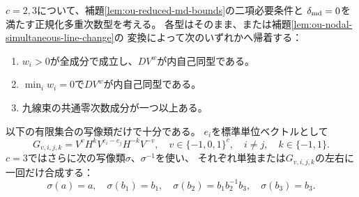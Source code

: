 \begin{proposition}[全節点型候補の有限等式証明書]
\label{prop:ou-nodal-complete-word-certificate}
$c=2,3$について、補題\ref{lem:ou-reduced-md-bounds}の二項必要条件と
$\delta_{\rm md}=0$を満たす正規化多重次数型を考える。
各型はそのまま、または補題\ref{lem:ou-nodal-simultaneous-line-change}の
変換によって次のいずれかへ帰着する：
\begin{enumerate}[label=(\roman*)]
\item $w_i>0$が全成分で成立し、$DV^w$が内自己同型である。
\item $\min_i w_i=0$で$DV^w$が内自己同型である。
\item 九線束の共通零次数成分が一つ以上ある。
\end{enumerate}
以下の有限集合の写像類だけで十分である。
$e_i$を標準単位ベクトルとして
\[
 G_{v,i,j,k}=V^v H^k V^{e_i-e_j}H^{-k}V^{-v},
 \quad v\in\{-1,0,1\}^c,\quad i\ne j,\quad k\in\{-1,1\}.
\]
$c=3$ではさらに次の写像類$\sigma$、$\sigma^{-1}$を使い、
それぞれ単独または$G_{v,i,j,k}$の左右に一回だけ合成する：
\[
 \sigma(a)=a,\quad \sigma(b_1)=b_1,\quad
 \sigma(b_2)=b_1 b_2^{-1} b_3,\quad \sigma(b_3)=b_3 .
\]
\end{proposition}
